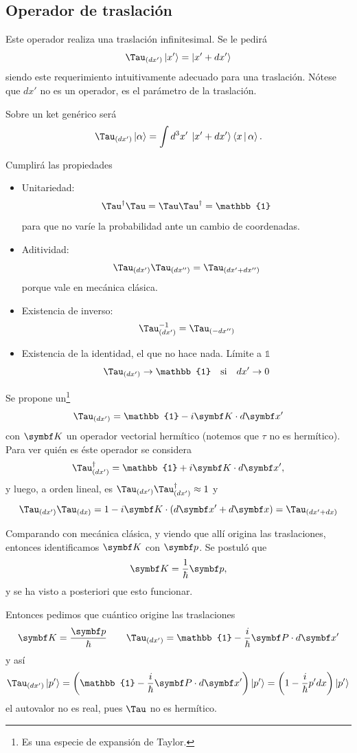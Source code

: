 \documentclass[10pt,oneside]{CBFT_book}
\begin{document}
\subsection{Operador de traslación}

Este operador realiza una traslación infinitesimal.
Se le pedirá
\[
	\Tau_{(dx')} \Ket{x'} = \Ket{x'+dx'}
\]
siendo este requerimiento intuitivamente adecuado para una traslación. 
Nótese que $dx'$ no es un operador, es el parámetro de la traslación.

Sobre un ket genérico será
\[
	\Tau_{(dx')} \Ket{\a} = \int d^3x' \: \Ket{x'+dx'} \Braket{x|\a}.
\]

Cumplirá las propiedades
\begin{itemize}
 \item Unitariedad:
 \[
	\Tau^\dagger\Tau = \Tau \Tau^\dagger = \mathbb{1}
 \]
 para que no varíe la probabilidad ante un cambio de coordenadas.
 \item Aditividad:
 \[
	\Tau_{(dx')}\Tau_{(dx'')} = \Tau_{(dx'+dx'')}
 \]
 porque vale en mecánica clásica.
 \item Existencia de inverso:
 \[
	\Tau_{(dx')}^{-1} = \Tau_{(-dx'')}
 \]
 \item Existencia de la identidad, el que no hace nada. Límite a $\mathbb{1}$
 \[
	\Tau_{(dx')} \to \mathbb{1} \quad \text{si} \quad dx' \to 0
 \]
\end{itemize}

Se propone un\footnote{Es una especie de expansión de Taylor.} 
\[
	\Tau_{(dx')} = \mathbb{1} - i \vb{K}\cdot d\vb{x}'
\]
con $\vb{K}$ un operador vectorial hermítico (notemos que $\tau$ no es hermítico). 
Para ver quién es éste operador se considera
\[
	\Tau_{(dx')}^\dagger = \mathbb{1} + i \vb{K}\cdot d\vb{x}',
\]
y luego, a orden lineal, es $ \Tau_{(dx')} \Tau_{(dx')}^\dagger \approx 1$ y
\[
	\Tau_{(dx')} \Tau_{(dx)} = 1 - i \vb{K}\cdot ( d\vb{x}' + d\vb{x} )
	= \Tau_{(dx' + dx)}
\]

Comparando con mecánica clásica, y viendo que allí  origina las traslaciones, 
entonces identificamos $\vb K$ con $\vb p$. Se postuló que 
\[
	\vb K = \frac{1}{\hbar} \vb p,
\]
y se ha visto a posteriori que esto funcionar.

Entonces pedimos que  cuántico origine las traslaciones
\[
	\vb{K} = \frac{\vb{p}}{\hbar} \qquad \Tau_{(dx')} = 
	\mathbb{1} - \frac{i}{\hbar} \vb{P}\cdot d\vb{x}'
\]
y así
\[
	\Tau_{(dx')}\Ket{p'} =
	\left( \mathbb{1} - \frac{i}{\hbar} \vb{P}\cdot d\vb{x}' \right)\Ket{p'} =
	\left( 1 - \frac{i}{\hbar} p' dx \right)\Ket{p'}
\]
el autovalor no es real, pues $\Tau$ no es hermítico.
\end{document}
